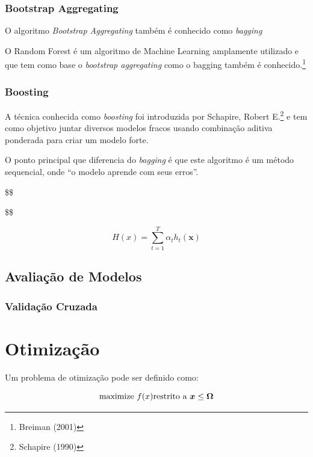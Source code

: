 \documentclass[
	12pt,				%
	a4paper,		%
	oneside,    %
	chapter=TITLE,		   %
	section=TITLE,		   %
	subsection=TITLE,	   %
	subsubsection=TITLE, %
	english,			%
	french,				%
	spanish,			%
	brazil,				%
]{abntex2}
\begin{document}
\hypertarget{bootstrap-aggregating}{%
\subsubsection{Bootstrap Aggregating}\label{bootstrap-aggregating}}

O algoritmo \emph{Bootstrap Aggregating} também é conhecido como
\emph{bagging}

O Random Forest é um algoritmo de Machine Learning amplamente utilizado
e que tem como base o \emph{bootstrap aggregating} como o bagging também
é conhecido.\footnote{Breiman (2001)}

\hypertarget{boosting}{%
\subsubsection{Boosting}\label{boosting}}

A técnica conhecida como \emph{boosting} foi introduzida por Schapire,
Robert E.\footnote{Schapire (1990)} e tem como objetivo juntar diversos
modelos fracos usando combinação aditiva ponderada para criar um modelo
forte.

O ponto principal que diferencia do \emph{bagging} é que este algoritmo
é um método sequencial, onde ``o modelo aprende com seus erros''.

\$\$

\$\$

\[
H(x) = \sum_{t=1}^T{\alpha_th_t(\boldsymbol{x})}
\]

\hypertarget{avaliauxe7uxe3o-de-modelos}{%
\subsection{Avaliação de Modelos}\label{avaliauxe7uxe3o-de-modelos}}

\hypertarget{validauxe7uxe3o-cruzada}{%
\subsubsection{Validação Cruzada}\label{validauxe7uxe3o-cruzada}}

\hypertarget{otimizauxe7uxe3o}{%
\section{Otimização}\label{otimizauxe7uxe3o}}

Um problema de otimização pode ser definido como:

\[
\mbox{maximize } f(x) \\
\\
\mbox{restrito a } \boldsymbol{x} \leq \boldsymbol{\Omega}
\]
\end{document}
